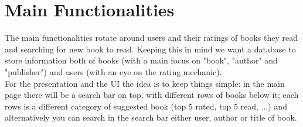 \section{Main Functionalities}

The main functionalities rotate around users and their ratings of books they read and searching for new book to read. Keeping this in mind we want a database to store information both of books (with a main focus on "book", "author" and "publisher") and users (with an eye on the rating mechanic).\\
For the presentation and the UI the idea is to keep things simple: in the main page there will be a search bar on top, with different rows of books below it; each rows is a different category of suggested book (top 5 rated, top 5 read, ...) and alternatively you can search in the search bar either user, author or title of book.\\
